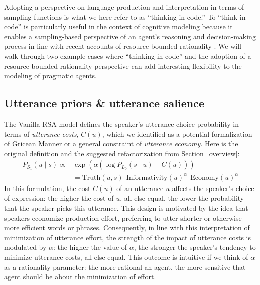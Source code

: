 \documentclass[10pt,letterpaper]{article}
\begin{document}
Adopting a perspective on language production and interpretation in terms of sampling functions is what we here refer to as ``thinking in code.''
To ``think in code'' is particularly useful in the context of cognitive modeling because it enables a sampling-based perspective of an agent's reasoning and decision-making process in line with recent accounts of resource-bounded rationality \cite{GriffithsLieder2015:Rational-Use-of, lieder2020resource}.
We will walk through two example cases where ``thinking in code'' and the adoption of a resource-bounded rationality perspective can add interesting flexibility to the modeling of pragmatic agents.

\subsection*{Utterance priors \& utterance salience}

The Vanilla RSA model defines the speaker's utterance-choice probability in terms of \emph{utterance costs}, $C(u)$, which we identified as a potential formalization of Gricean Manner or a general constraint of \emph{utterance economy}.
Here is the original definition and the suggested refactorization from Section~\ref{overview}:
\begin{align} \label{S1-repeat-again}
  P_{S_1}(u\mid s) \propto & \exp (\alpha (\log P_{L_0}(s \mid u) - C(u)))  \\
       & = \text{Truth}(u,s) \ \ \text{Informativity}(u)^{\alpha} \ \ \text{Economy}(u)^{\alpha} \nonumber
\end{align}
In this formulation, the cost $C(u)$ of an utterance $u$ affects the speaker's choice of expression: the higher the cost of $u$, all else equal, the lower the probability that the speaker picks this utterance.
This design is motivated by the idea that speakers economize production effort, preferring to utter shorter or otherwise more efficient words or phrases.
Consequently, in line with this interpretation of minimization of utterance effort, the strength of the impact of utterance costs is modulated by $\alpha$: the higher the value of $\alpha$, the stronger the speaker's tendency to minimize utterance costs, all else equal.
This outcome is intuitive if we think of $\alpha$ as a rationality parameter:
the more rational an agent, the more sensitive that agent should be about the minimization of effort.
\end{document}
